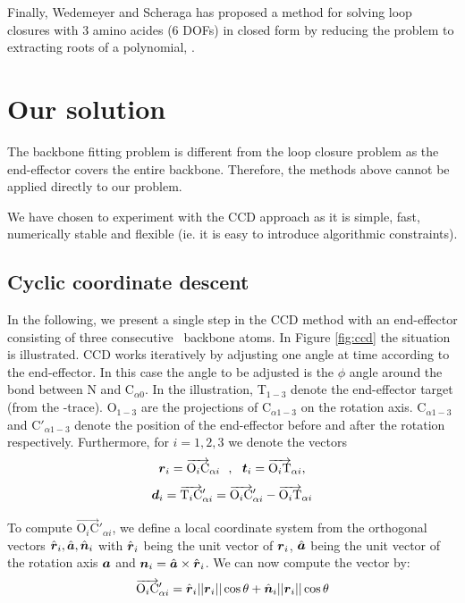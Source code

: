 Finally, Wedemeyer and Scheraga has proposed a method for solving loop closures with 3 amino acides (6 DOFs) in closed form by reducing the problem to extracting roots of a polynomial, \cite{wedemeyer1999exact}.


\section{Our solution}
The backbone fitting problem is different from the loop closure problem as the end-effector covers the entire backbone.
Therefore, the methods above cannot be applied directly to our problem.

We have chosen to experiment with the CCD approach as it is simple, fast, numerically stable and flexible (ie. it is easy to introduce algorithmic constraints).

\subsection{Cyclic coordinate descent}
In the following, we present a single step in the CCD method with an end-effector consisting of three consecutive \Ca\ backbone atoms.
In Figure \ref{fig:ccd} the situation is illustrated.
CCD works iteratively by adjusting one angle at time according to the end-effector.
In this case the angle to be adjusted is the $\phi$ angle around the bond between N and C$_{\alpha0}$.
In the illustration, T$_{1-3}$ denote the end-effector target (from the \Ca-trace). O$_{1-3}$ are the projections of C$_{\alpha1-3}$ on the rotation axis. C$_{\alpha1-3}$ and C$'_{\alpha1-3}$ denote the position of the end-effector before and after the rotation respectively.
Furthermore, for $i=1,2,3$ we denote the vectors
 $$\boldsymbol{r}_i = \overrightarrow{\text{O}_i\text{C}}_{\alpha i}~~,~~ \boldsymbol{t}_i = \overrightarrow{\text{O}_i\text{T}}_{\alpha i} , $$
$$\boldsymbol{d}_i = \overrightarrow{\text{T}_i\text{C}}'_{\alpha i} = \overrightarrow{\text{O}_i\text{C}}'_{\alpha i}-\overrightarrow{\text{O}_i\text{T}}_{\alpha i}$$

To compute $\overrightarrow{\text{O}_i\text{C}}'_{\alpha i}$, we define a local coordinate system from the orthogonal vectors $\hat{\boldsymbol{r}}_i, \hat{\boldsymbol{a}}, \hat{\boldsymbol{n}}_i$ with $\hat{\boldsymbol{r}}_i$ being the unit vector of $\boldsymbol{r}_i$, $\hat{\boldsymbol{a}}$ being the unit vector of the rotation axis $\boldsymbol{a}$ and $\boldsymbol{n}_i = \hat{\boldsymbol{a}} \times \hat{\boldsymbol{r}}_i$. We can now compute the vector by:
$$\overrightarrow{\text{O}_i\text{C}}'_{\alpha i} = \hat{\boldsymbol{r}}_i||\boldsymbol{r}_i||\cos\theta + \hat{\boldsymbol{n}}_i||\boldsymbol{r}_i||\cos\theta$$

